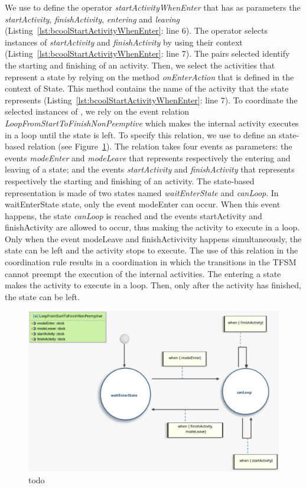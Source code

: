 We use \bcool to define the operator \emph{startActivityWhenEnter} that has as parameters the \dse \textit{startActivity}, \textit{finishActivity}, \textit{entering} and \textit{leaving} (Listing~\ref{lst:bcoolStartActivityWhenEnter}: line 6). The operator selects instances of \dse \emph{startActivity} and \emph{finishActivity} by using their context (Listing~\ref{lst:bcoolStartActivityWhenEnter}: line 7). The pairs selected identify the starting and finishing of an activity. Then, we select the activities that represent a state by relying on the method \emph{onEnterAction} that is defined in the context of State. This method contains the name of the activity that the state represents (Listing~\ref{lst:bcoolStartActivityWhenEnter}: line 7). To coordinate the selected instances of \dse, we rely on the event relation \emph{LoopFromStartToFinishNonPeemptive} which makes the internal activity executes in a loop until the state is left. To specify this relation, we use \moccml to define an state-based relation (see Figure~\ref{fig:looprelation}). The relation takes four events as parameters: the events \emph{modeEnter} and \emph{modeLeave} that represents respectively the entering and leaving of a state; and the events \emph{startActivity} and \emph{finishActivity} that represents respectively the starting and finishing of an activity. The state-based representation is made of two states named \emph{waitEnterState} and \emph{canLoop}. In waitEnterState state, only the event modeEnter can occur. When this event happens, the state \emph{canLoop} is reached and the events startActivity and finishActivity are allowed to occur, thus making the activity to execute in a loop. Only when the event modeLeave and finishActivivity happens simultaneously, the state can be left and the activity stops to execute. The use of this relation in the coordination rule results in a coordination in which the transitions in the TFSM cannot preempt the execution of the internal activities. The entering a state makes the activity to execute in a loop. Then, only after the activity has finished, the state can be left.


\begin{figure}
	\center
	\includegraphics[width=.7\columnwidth]{examples/figs/LoopFromStartToFinishNonPreemptive}
	\caption{todo}
	\label{fig:looprelation}
\end{figure}



